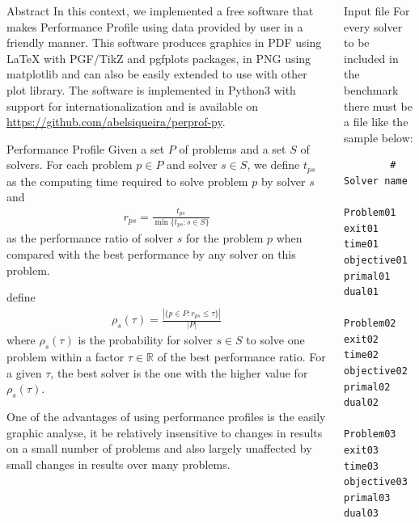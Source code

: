 \documentclass[]{beamer}
\begin{document}
\begin{frame}[t,fragile]
\begin{columns}[t]
\begin{column}{0.4\textwidth}
\begin{block}{Abstract}
        In this context, we implemented a free software that makes Performance
        Profile using data provided by user in a friendly manner. This software
        produces graphics in PDF using LaTeX with PGF/TikZ\nocite{TikZ} and
        pgfplots\nocite{pgfplots} packages, in PNG using
        matplotlib\nocite{Hunter:2007} and can also be easily extended to use with
        other plot library. The software is implemented in Python3 with support
        for internationalization and is available on
        \url{https://github.com/abelsiqueira/perprof-py}.
      \end{block}

      \begin{block}{Performance Profile}
        Given a set $P$ of problems and a set $S$ of solvers. For each problem $p
        \in P$ and solver $s \in S$, we define $t_{ps}$ as the computing time
        required to solve problem $p$ by solver $s$ and
        \begin{align*}
          r_{ps} = \frac{t_{ps}}{\min\{t_{ps}: s \in S\}}
        \end{align*}
        as the performance ratio of solver $s$ for the problem $p$ when compared
        with the best performance by any solver on this problem.

        \citeauthor{Dolan2001} define
        \begin{align*}
          \rho_s(\tau) = \frac{| \{p \in P: r_{ps} \leq \tau\} |}{| P |}
        \end{align*}
        where $\rho_s(\tau)$ is the probability for solver $s \in S$ to solve one
        problem within a factor $\tau \in \mathbb{R}$ of the best performance
        ratio. For a given $\tau$, the best solver is the one with the higher
        value for $\rho_s(\tau)$.

        One of the advantages of using performance profiles is the easily graphic
        analyse, it be relatively insensitive to changes in results on a small
        number of problems and also largely unaffected by small changes in
        results over many problems.
      \end{block}
    \end{column}
    \begin{column}{0.4\textwidth}
      \begin{block}{Input file}
        For every solver to be included in the benchmark there must be a file like
        the sample below:

        \begin{lstlisting}
        # Solver name
        Problem01 exit01 time01 objective01 primal01 dual01
        Problem02 exit02 time02 objective02 primal02 dual02
        Problem03 exit03 time03 objective03 primal03 dual03
        \end{lstlisting}


\end{block}
\end{column}
\end{columns}
\end{frame}
\end{document}

